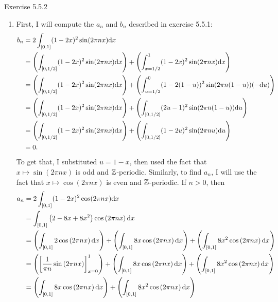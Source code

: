 \documentclass{article}
\begin{document}
\bigskip
\begin{prob}
    Exercise 5.5.2
\end{prob}
\begin{enumerate}[label=(\alph*)]
    \item First, I will compute the $a_n$ and $b_n$ described in exercise 5.5.1:
    \begin{align*}
            b_n &= 2 \int_{[0,1]} (1-2x)^2 \sin(2\pi n x) \mathrm{d} x \\
                &= \left( \int_{[0,1/2]} (1-2x)^2 \sin(2 \pi n x) \mathrm{d} x \right) + \left( \int_{x=1/2}^1 (1-2x)^2 \sin(2 \pi n x) \mathrm{d} x \right) \\
                &= \left( \int_{[0,1/2]} (1-2x)^2 \sin(2 \pi n x) \mathrm{d} x \right) + \left( \int_{u=1/2}^0 (1-2(1-u))^2 \sin(2 \pi n (1-u)) (-\mathrm{d} u) \right) \\
                &= \left( \int_{[0,1/2]} (1-2x)^2 \sin(2 \pi n x) \mathrm{d} x \right) + \left( \int_{[0, 1/2]} (2u-1)^2 \sin(2 \pi n (1-u)) \mathrm{d} u \right) \\
                &= \left( \int_{[0,1/2]} (1-2x)^2 \sin(2 \pi n x) \mathrm{d} x \right) + \left( \int_{[0, 1/2]} (1-2u)^2 \sin(2 \pi n u) \mathrm{d} u \right) \\
                &= 0.
    \end{align*}
    To get that, I substituted $u=1-x$, then used the fact that $x \mapsto \sin(2 \pi n x)$ is odd and $\mathbb{Z}$-periodic. Similarly, to find $a_n$, I will use the fact that $x \mapsto \cos(2 \pi n x)$ is even and $\mathbb{Z}$-periodic. If $n > 0$, then
    \begin{align*}
            a_n &= 2 \int_{[0,1]} (1-2x)^2 \cos(2\pi n x) \d x \\
                &= \int_{[0,1]} \left( 2-8x+8x^2 \right) \cos \left( 2 \pi n x \right) \d x \\
                &= \left( \int_{[0,1]} 2 \cos \left( 2 \pi n x \right) \d x \right) + \left( \int_{[0,1]} 8x \cos \left( 2 \pi n x \right) \d x \right) + \left( \int_{[0,1]} 8x^2 \cos \left( 2 \pi n x \right) \d x \right) \\
                &= \left( \left[ \frac{1}{\pi n} \sin \left( 2 \pi n x \right)  \right]_{x=0}^1 \right) + \left( \int_{[0,1]} 8x \cos \left( 2 \pi n x \right) \d x \right) + \left( \int_{[0,1]} 8x^2 \cos \left( 2 \pi n x \right) \d x \right) \\
                &= \left( \int_{[0,1]} 8x \cos \left( 2 \pi n x \right) \d x \right) + \left( \int_{[0,1]} 8x^2 \cos \left( 2 \pi n x \right) \d x \right) \\

\end{align*}
\end{enumerate}
\end{document}
